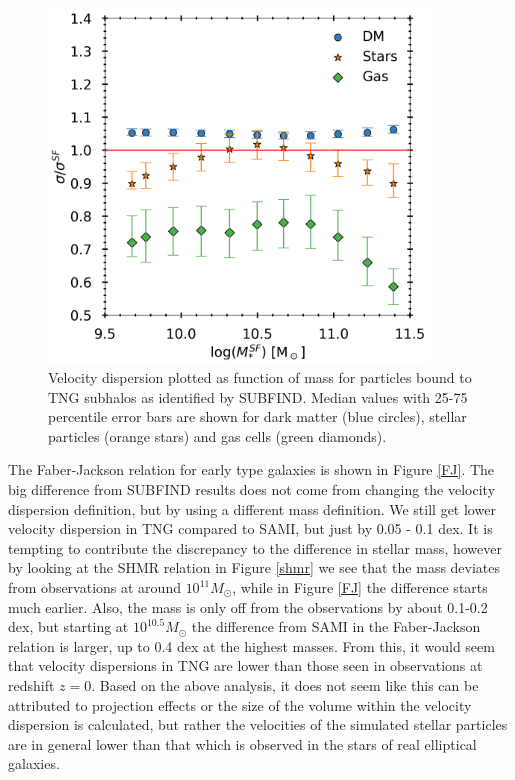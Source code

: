 \begin{figure}
    \centering
    \includegraphics[width=0.9\textwidth]{images/VD_particles.png}
    \caption{Velocity dispersion plotted as function of mass for particles bound to TNG subhalos as identified by SUBFIND. Median values with 25-75 percentile error bars are shown for dark matter (blue circles), stellar particles (orange stars) and gas cells (green diamonds).}
    \label{VD_part}
\end{figure}


The Faber-Jackson relation for early type galaxies is shown in Figure \ref{FJ}. The big difference from SUBFIND results does not come from changing the velocity dispersion definition, but by using a different mass definition. We still get lower velocity dispersion in TNG compared to SAMI, but just by 0.05 - 0.1 dex. It is tempting to contribute the discrepancy to the difference in stellar mass, however by looking at the SHMR relation in Figure \ref{shmr} we see that the mass deviates from observations at around $10^{11} M_{\odot}$, while in Figure \ref{FJ} the difference starts much earlier. Also, the mass is only off from the observations by about 0.1-0.2 dex, but starting at $10^{10.5} M_{\odot}$ the difference from SAMI in the Faber-Jackson relation is larger, up to 0.4 dex at the highest masses. From this, it would seem that velocity dispersions in TNG are lower than those seen in observations at redshift $z=0$. Based on the above analysis, it does not seem like this can be attributed to projection effects or the size of the volume within the velocity dispersion is calculated, but rather the velocities of the simulated stellar particles are in general lower than that which is observed in the stars of real elliptical galaxies.

